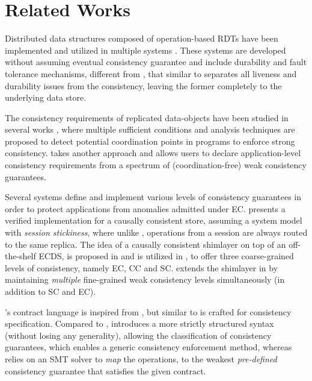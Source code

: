 \section{Related Works}
\label{sec:rel_works}

Distributed data structures composed of  operation-based RDTs \cite{rdt,crdt} have been implemented and utilized in
multiple systems \cite{tango,cassandra}. 
These systems are developed without assuming eventual consistency
guarantee and include durability and fault tolerance mechanisms,
different from \tool, that similar to \cite{bolton} separates all liveness
and durability issues from the consistency, leaving the former
completely to the underlying data store.


The consistency requirements of replicated data-objects have been
studied in several works \cite{autoc,mahsa,bloom}, where multiple
sufficient conditions and analysis techniques are proposed to detect
potential coordination points in programs to enforce strong consistency. \tool takes another approach
and allows users to declare application-level consistency requirements
from a spectrum of (coordination-free) weak consistency guarantees.



Several systems \cite{geofast,petersen,cbs,chapar,bolton,quelea} define
and implement various levels of consistency guarantees in order to
protect applications from anomalies admitted under EC.
\cite{chapar} presents a verified implementation for a causally
consistent store, assuming a system model with \emph{session stickiness}, 
where unlike \tool, operations from a session are always routed to the same
replica. The idea of a causally consistent shimlayer on top of an off-the-shelf
ECDS, is proposed in \cite{bolton} and is utilized in \cite{quelea},
to offer three coarse-grained levels of consistency, namely EC, CC and SC. 
\tool extends the shimlayer in \cite{quelea} by maintaining \emph{multiple}
fine-grained weak consistency levels simultaneously (in addition to SC
and EC). 

\tool's contract language is inspired
from \cite{rdt,rdtabs}, but similar to \cite{quelea} is crafted for
consistency specification. Compared to \cite{quelea}, \tool introduces a 
more strictly structured syntax (without losing any generality), 
allowing the classification of consistency  guarantees, which enables a 
generic consistency enforcement method, whereas \cite{quelea} relies on
an SMT solver to \emph{map} the operations, to the weakest
\emph{pre-defined} consistency guarantee that satisfies the given
contract. 









